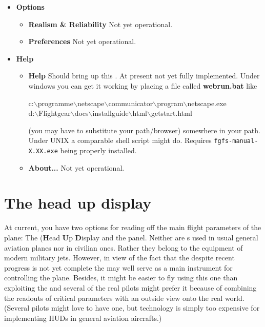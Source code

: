 \begin{itemize}
 \item \textbf{Options}
 \begin{itemize}
 \item \textbf{Realism \& Reliability} Not yet operational.
 \item \textbf{Preferences} Not yet operational.
 \end{itemize}

 \item \textbf{Help}
 \begin{itemize}
 \item \textbf{Help} Should bring up this . At present not yet fully
 implemented. Under windows you can get it working by placing a file called \textbf{webrun.bat}
 like

\begin{texttt}
 c:$\backslash$programme$\backslash$netscape$\backslash$communicator$\backslash$program$\backslash$netscape.exe\\
 d:$\backslash$Flightgear$\backslash$docs$\backslash$installguide$\backslash$html$\backslash$getstart.html
\end{texttt}

(you may have to substitute your path/browser) somewhere in your path. Under UNIX a
comparable shell script might do. Requires \texttt{fgfs-manual-X.XX.exe} being properly
installed.

 \item \textbf{About...} Not yet operational.
 \end{itemize}
\end{itemize}

\section{The head up display}

At current, you have two options for reading off the main flight parameters of the plane:
The  (\textbf{H}ead \textbf{U}p \textbf{D}isplay  and
the panel. Neither are s used in usual general aviation planes nor in civilian
ones. Rather they belong to the equipment of modern military jets. However, in view of
the fact that the  despite recent progress is not yet complete the
 may well serve as a main instrument for controlling the plane. Besides, it
might be easier to fly using this one than exploiting the  and several of
the real pilots might prefer it because of combining the readouts of critical parameters
with an outside view onto the real world. (Several  pilots might love to
have one, but technology is simply too expensive for implementing HUDs in general
aviation aircrafts.)
\medskip

